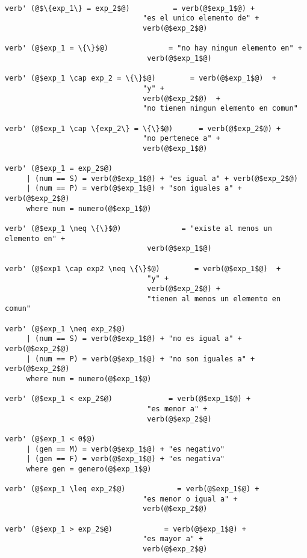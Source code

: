 \begin{verbatim}

verb' (@$\{exp_1\} = exp_2$@)          = verb(@$exp_1$@) + 
                                "es el unico elemento de" + 
                                verb(@$exp_2$@)

verb' (@$exp_1 = \{\}$@)              = "no hay ningun elemento en" + 
                                 verb(@$exp_1$@) 

verb' (@$exp_1 \cap exp_2 = \{\}$@)        = verb(@$exp_1$@)  +  
                                "y" +  
                                verb(@$exp_2$@)  +  
                                "no tienen ningun elemento en comun"

verb' (@$exp_1 \cap \{exp_2\} = \{\}$@)      = verb(@$exp_2$@) +  
                                "no pertenece a" +  
                                verb(@$exp_1$@) 

verb' (@$exp_1 = exp_2$@)
     | (num == S) = verb(@$exp_1$@) + "es igual a" + verb(@$exp_2$@) 
     | (num == P) = verb(@$exp_1$@) + "son iguales a" + verb(@$exp_2$@) 
     where num = numero(@$exp_1$@)

verb' (@$exp_1 \neq \{\}$@)              = "existe al menos un elemento en" +  
                                 verb(@$exp_1$@) 

verb' (@$exp1 \cap exp2 \neq \{\}$@)        = verb(@$exp_1$@)  +  
                                 "y" +  
                                 verb(@$exp_2$@) +  
                                 "tienen al menos un elemento en comun" 

verb' (@$exp_1 \neq exp_2$@)
     | (num == S) = verb(@$exp_1$@) + "no es igual a" + verb(@$exp_2$@) 
     | (num == P) = verb(@$exp_1$@) + "no son iguales a" + verb(@$exp_2$@) 
     where num = numero(@$exp_1$@)

verb' (@$exp_1 < exp_2$@)             = verb(@$exp_1$@) +  
                                 "es menor a" +  
                                 verb(@$exp_2$@) 

verb' (@$exp_1 < 0$@)
     | (gen == M) = verb(@$exp_1$@) + "es negativo" 
     | (gen == F) = verb(@$exp_1$@) + "es negativa" 
     where gen = genero(@$exp_1$@)
                                 
verb' (@$exp_1 \leq exp_2$@)            = verb(@$exp_1$@) +  
                                "es menor o igual a" +  
                                verb(@$exp_2$@) 

verb' (@$exp_1 > exp_2$@)            = verb(@$exp_1$@) +  
                                "es mayor a" +  
                                verb(@$exp_2$@) 


\end{verbatim}
